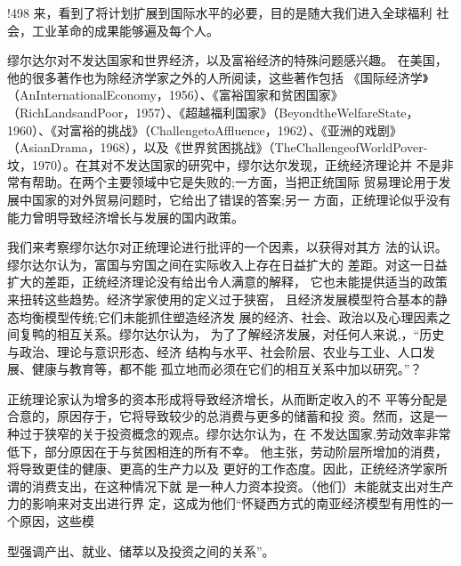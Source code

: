 !498
来，看到了将计划扩展到国际水平的必要，目的是随大我们进入全球福利
社会，工业革命的成果能够遍及每个人。

缪尔达尔对不发达国家和世界经济，以及富裕经济的特殊问题感兴趣。
在美国，他的很多著作也为除经济学家之外的人所阅读，这些著作包括
《国际经济学》（AnInternationalEconomy，1956）、《富裕国家和贫困国家》
（RichLandsandPoor，1957）、《超越福利国家》（BeyondtheWelfareState，
1960）、《对富裕的挑战》（ChallengetoAffluence，1962）、《亚洲的戏剧》
（AsianDrama，1968），以及《世界贫困挑战》（TheChallengeofWorldPover-
坟，1970）。在其对不发达国家的研究中，缪尔达尔发现，正统经济理论并
不是非常有帮助。在两个主要领域中它是失败的;一方面，当把正统国际
贸易理论用于发展中国家的对外贸易问题时，它给出了错误的答案;另一
方面，正统理论似乎没有能力曾明导致经济增长与发展的国内政策。

我们来考察缪尔达尔对正统理论进行批评的一个因素，以获得对其方
法的认识。缪尔达尔认为，富国与穷国之间在实际收入上存在日益扩大的
差距。对这一日益扩大的差距，正统经济理论没有给出令人满意的解释，
它也未能提供适当的政策来扭转这些趋势。经济学家使用的定义过于狭窑，
且经济发展模型符合基本的静态均衡模型传统;它们未能抓住塑造经济发
展的经济、社会、政治以及心理因素之间复鸭的相互关系。缪尔达尔认为，
为了了解经济发展，对任何人来说,，“历史与政治、理论与意识形态、经济
结构与水平、社会阶层、农业与工业、人口发展、健康与教育等，都不能
孤立地而必须在它们的相互关系中加以研究。”？

正统理论家认为增多的资本形成将导致经济增长，从而断定收入的不
平等分配是合意的，原因存于，它将导致较少的总消费与更多的储蓄和投
资。然而，这是一种过于狭窄的关于投资概念的观点。缪尔达尔认为，在
不发达国家,劳动效率非常低下，部分原因在于与贫困相连的所有不幸。
他主张，劳动阶层所增加的消费，将导致更佳的健康、更高的生产力以及
更好的工作态度。因此，正统经济学家所谓的消费支出，在这种情况下就
是一种人力资本投资。（他们）未能就支出对生产力的影响来对支出进行界
定，这成为他们“怀疑西方式的南亚经济模型有用性的一个原因，这些模

型强调产出、就业、储萃以及投资之间的关系”。

